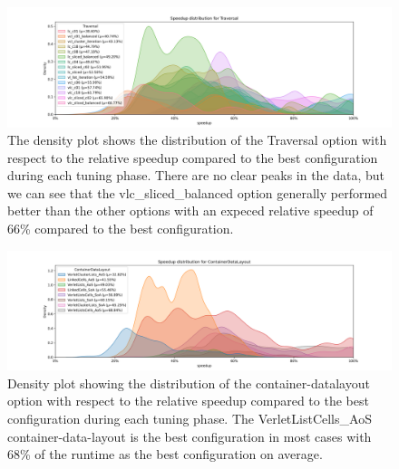 \begin{figure}[h]
    \centering
    \includegraphics[width=\columnwidth,trim={1cm 0 2cm 1.5cm},clip]{figures/DataAnalytics/speedup_Traversal.png}
    \caption[Speedup density plot of Traversal option]{The density plot shows the distribution of the Traversal option with respect to the relative speedup compared to the best configuration during each tuning phase. There are no clear peaks in the data, but we can see that the vlc\_sliced\_balanced option generally performed better than the other options with an expeced relative speedup of 66\% compared to the best configuration.}
    \label{fig:inputAnalysisDensityTraversal}
\end{figure}

\begin{figure}[h]
    \centering
    \includegraphics[width=\columnwidth,trim={1cm 0 2cm 1.5cm},clip]{figures/DataAnalytics/speedup_ContainerDataLayout.png}
    \caption[Speedup density plot of Configuration-Datalayout option]{Density plot showing the distribution of the container-datalayout option with respect to the relative speedup compared to the best configuration during each tuning phase. The VerletListCells\_AoS container-data-layout is the best configuration in most cases with 68\% of the runtime as the best configuration on average.}
    \label{fig:inputAnalysisDensityDatalayout}
\end{figure}

